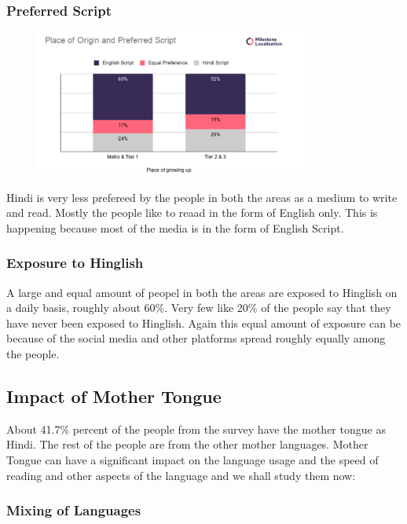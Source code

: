 \documentclass{article}
\begin{document}
\subsubsection{Preferred Script}

\begin{figure}[H]
    \centering
    \includegraphics[width=0.8\textwidth]{plots/origin_preferred_script.png}
\end{figure}

Hindi is very less prefereed by the people in both the areas as a medium to write and read. Mostly the people like to reaad in the form of English only. This is happening because most of the media is in the form of English Script.

\subsubsection{Exposure to Hinglish}

A large and equal amount of peopel in both the areas are exposed to Hinglish on a daily basis, roughly about 60\%. Very few like 20\% of the people say that they have never been exposed to Hinglish. Again this equal amount of exposure can be because of the social media and other platforms spread roughly equally among the people.  

\subsection{Impact of Mother Tongue}

About 41.7\% percent of the people from the survey have the mother tongue as Hindi. The rest of the people are from the other mother languages. Mother Tongue can have a significant impact on the language usage and the speed of reading and other aspects of the language and we shall study them now:

\subsubsection{Mixing of Languages}
\end{document}
